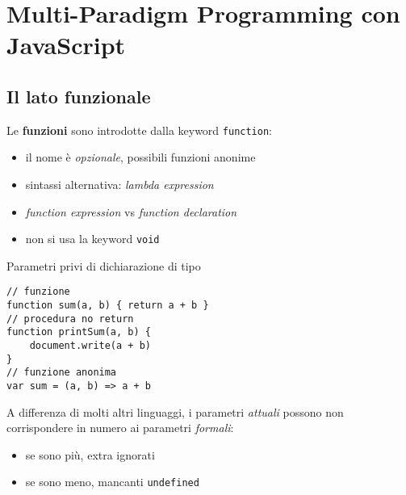 \chapter{Multi-Paradigm Programming con JavaScript}

\section{Il lato funzionale}

Le \textbf{funzioni} sono introdotte dalla keyword \texttt{function}:
\begin{itemize}
    \item il nome è \textit{opzionale}, possibili funzioni anonime
    \item sintassi alternativa: \textit{lambda expression}
    \item \textit{function expression} vs \textit{function declaration}
    \item non si usa la keyword \texttt{void}
\end{itemize}

Parametri privi di dichiarazione di tipo
\begin{verbatim}
// funzione
function sum(a, b) { return a + b }
// procedura no return
function printSum(a, b) {
    document.write(a + b)
}
// funzione anonima
var sum = (a, b) => a + b
\end{verbatim}

A differenza di molti altri linguaggi, i parametri \textit{attuali} possono non corrispondere in numero ai parametri \textit{formali}:
\begin{itemize}
    \item se sono più, extra ignorati
    \item se sono meno, mancanti \texttt{undefined}
\end{itemize}

